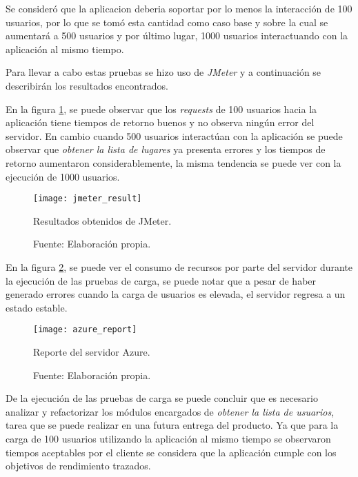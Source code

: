  Se consideró que la aplicacion deberia soportar por lo menos la interacción de 100 usuarios, por lo que se tomó esta cantidad como caso base y sobre la cual se aumentará a 500 usuarios y por último lugar, 1000 usuarios interactuando con la aplicación al mismo tiempo.

  Para llevar a cabo estas pruebas se hizo uso de \emph{JMeter} y a continuación se describirán los resultados encontrados.

 En la figura \ref{fig:jmeter_result}, se puede observar que los \emph{requests} de 100 usuarios hacia la aplicación tiene tiempos de retorno buenos y no observa ningún error del servidor. En cambio cuando 500 usuarios interactúan con la aplicación se puede observar que \emph{obtener la lista de lugares} ya presenta errores y los tiempos de retorno aumentaron considerablemente, la misma tendencia se puede ver con la ejecución de 1000 usuarios.


  \begin{figure}[H]
        \begin{center}
          \texttt{[image: jmeter\_result]}

          \caption{Resultados obtenidos de JMeter.}
          \label{fig:jmeter_result}
          \caption*{Fuente: Elaboración propia.}
        \end{center}
  \end{figure}

 En la figura \ref{fig:azure_report}, se puede ver el consumo de recursos por parte del servidor durante la ejecución de las pruebas de carga, se puede notar que a pesar de haber generado errores cuando la carga de usuarios es elevada, el servidor regresa a un estado estable.

  \begin{figure}[H]
        \begin{center}
          \texttt{[image: azure\_report]}

          \caption{Reporte del servidor Azure.}
          \label{fig:azure_report}
          \caption*{Fuente: Elaboración propia.}
        \end{center}
  \end{figure}



  De la ejecución de las pruebas de carga se puede concluir que es necesario analizar y refactorizar los módulos encargados de \emph{obtener la lista de usuarios}, tarea que se puede realizar en una futura entrega del producto. Ya que para la carga de 100 usuarios utilizando la aplicación al mismo tiempo se observaron tiempos aceptables por el cliente se considera que la aplicación cumple con los objetivos de rendimiento trazados.
